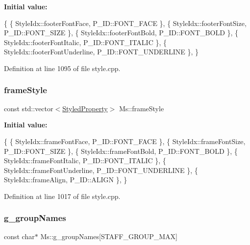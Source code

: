 {\bfseries Initial value\+:}
\begin{DoxyCode}
\{
      \{ StyleIdx::footerFontFace,                     P\_ID::FONT\_FACE              \},
      \{ StyleIdx::footerFontSize,                     P\_ID::FONT\_SIZE              \},
      \{ StyleIdx::footerFontBold,                     P\_ID::FONT\_BOLD              \},
      \{ StyleIdx::footerFontItalic,                   P\_ID::FONT\_ITALIC            \},
      \{ StyleIdx::footerFontUnderline,                P\_ID::FONT\_UNDERLINE         \},
      \}
\end{DoxyCode}


Definition at line 1095 of file style.\+cpp.

\mbox{\label{namespace_ms_a9c8159fa04061529481240beeeae9295}} 
\subsubsection{\texorpdfstring{frame\+Style}{frameStyle}}
{\footnotesize\ttfamily const std\+::vector$<$\hyperlink{struct_ms_1_1_styled_property}{Styled\+Property}$>$ Ms\+::frame\+Style}

{\bfseries Initial value\+:}
\begin{DoxyCode}
\{
      \{ StyleIdx::frameFontFace,                      P\_ID::FONT\_FACE              \},
      \{ StyleIdx::frameFontSize,                      P\_ID::FONT\_SIZE              \},
      \{ StyleIdx::frameFontBold,                      P\_ID::FONT\_BOLD              \},
      \{ StyleIdx::frameFontItalic,                    P\_ID::FONT\_ITALIC            \},
      \{ StyleIdx::frameFontUnderline,                 P\_ID::FONT\_UNDERLINE         \},
      \{ StyleIdx::frameAlign,                         P\_ID::ALIGN                  \},
      \}
\end{DoxyCode}


Definition at line 1017 of file style.\+cpp.

\mbox{\label{namespace_ms_a43943aca777e35ab6aa3b11487b056c6}} 
\subsubsection{\texorpdfstring{g\+\_\+group\+Names}{g\_groupNames}}
{\footnotesize\ttfamily const char$\ast$ Ms\+::g\+\_\+group\+Names\mbox{[}S\+T\+A\+F\+F\+\_\+\+G\+R\+O\+U\+P\+\_\+\+M\+AX\mbox{]}}

